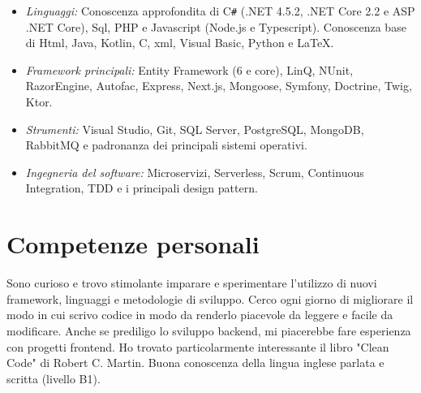 \documentclass[margin, 10pt]{res} %
\begin{document}
\begin{resume}
\begin{itemize}

\item {\sl Linguaggi:} Conoscenza approfondita di C\texttt{\#} (.NET 4.5.2, .NET Core 2.2 e ASP .NET Core), Sql, PHP e Javascript (Node.js e Typescript). Conoscenza base di Html, Java, Kotlin, C, xml, Visual Basic, Python e \LaTeX.
\item {\sl Framework principali:} Entity Framework (6 e core), LinQ, NUnit, RazorEngine, Autofac, Express, Next.js, Mongoose, Symfony, Doctrine, Twig, Ktor.
\item {\sl Strumenti:} Visual Studio, Git, SQL Server, PostgreSQL, MongoDB, RabbitMQ e padronanza dei principali sistemi operativi.
\item {\sl Ingegneria del software:} Microservizi, Serverless, Scrum, Continuous Integration, TDD e i principali design pattern.

\end{itemize}


\section{Competenze personali}

Sono curioso e trovo stimolante imparare e sperimentare l'utilizzo di nuovi framework, linguaggi e metodologie di sviluppo. Cerco ogni giorno di migliorare il modo in cui scrivo codice in modo da renderlo piacevole da leggere e facile da modificare. Anche se prediligo lo sviluppo backend, mi piacerebbe fare esperienza con progetti frontend. Ho trovato particolarmente interessante il libro "Clean Code" di Robert C. Martin.
Buona conoscenza della lingua inglese parlata e scritta (livello B1).

\end{resume}
\end{document}
